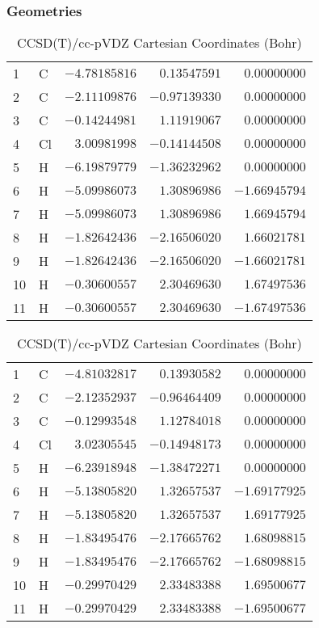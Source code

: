 \documentclass[10pt,oneside]{article}
\begin{document}
\begin{table}[h!]
\subsubsection*{Geometries}
\begin{multicols}{2}
\centering
\caption{CCSD(T)/cc-pVTZ Cartesian Coordinates (Bohr)}
\begin{tabular}{llrrr}
\toprule
1  & C  & $-4.78185816$ & $ 0.13547591$ & $ 0.00000000$ \\
2  & C  & $-2.11109876$ & $-0.97139330$ & $ 0.00000000$ \\
3  & C  & $-0.14244981$ & $ 1.11919067$ & $ 0.00000000$ \\
4  & Cl & $ 3.00981998$ & $-0.14144508$ & $ 0.00000000$ \\
5  & H  & $-6.19879779$ & $-1.36232962$ & $ 0.00000000$ \\
6  & H  & $-5.09986073$ & $ 1.30896986$ & $-1.66945794$ \\
7  & H  & $-5.09986073$ & $ 1.30896986$ & $ 1.66945794$ \\
8  & H  & $-1.82642436$ & $-2.16506020$ & $ 1.66021781$ \\
9  & H  & $-1.82642436$ & $-2.16506020$ & $-1.66021781$ \\
10 & H  & $-0.30600557$ & $ 2.30469630$ & $ 1.67497536$ \\
11 & H  & $-0.30600557$ & $ 2.30469630$ & $-1.67497536$ \\
\bottomrule
\end{tabular}
\caption{CCSD(T)/cc-pVDZ Cartesian Coordinates (Bohr)}
\begin{tabular}{llrrr}
\toprule
1  & C  & $-4.81032817$ & $ 0.13930582$ & $ 0.00000000$ \\
2  & C  & $-2.12352937$ & $-0.96464409$ & $ 0.00000000$ \\
3  & C  & $-0.12993548$ & $ 1.12784018$ & $ 0.00000000$ \\
4  & Cl & $ 3.02305545$ & $-0.14948173$ & $ 0.00000000$ \\
5  & H  & $-6.23918948$ & $-1.38472271$ & $ 0.00000000$ \\
6  & H  & $-5.13805820$ & $ 1.32657537$ & $-1.69177925$ \\
7  & H  & $-5.13805820$ & $ 1.32657537$ & $ 1.69177925$ \\
8  & H  & $-1.83495476$ & $-2.17665762$ & $ 1.68098815$ \\
9  & H  & $-1.83495476$ & $-2.17665762$ & $-1.68098815$ \\
10 & H  & $-0.29970429$ & $ 2.33483388$ & $ 1.69500677$ \\
11 & H  & $-0.29970429$ & $ 2.33483388$ & $-1.69500677$ \\
\bottomrule
\end{tabular}
\end{multicols}
\end{table}
\end{document}
